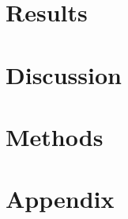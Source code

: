 \documentclass[10pt,letterpaper]{article}
\begin{document}
\section*{Results}
\label{result}
  
  
\section*{Discussion}
  







\section*{Methods}
  
  
\section*{Appendix}
    
\end{document}
